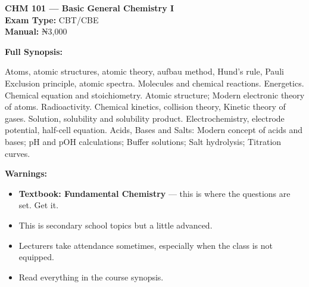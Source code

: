 \documentclass[11pt,a4paper]{article}
\begin{document}
\begin{coursebox}
    \textbf{\color{primary}\Large CHM 101 --- Basic General Chemistry I}\\[0.3em]
    \textbf{Exam Type:} CBT/CBE \\
    \textbf{Manual:} ₦3,000

    \vspace{0.8em}

    \textbf{Full Synopsis:}

    Atoms, atomic structures, atomic theory, aufbau method, Hund's rule, Pauli Exclusion principle, atomic spectra. Molecules and chemical reactions. Energetics. Chemical equation and stoichiometry. Atomic structure; Modern electronic theory of atoms. Radioactivity. Chemical kinetics, collision theory, Kinetic theory of gases. Solution, solubility and solubility product. Electrochemistry, electrode potential, half-cell equation.
    Acids, Bases and Salts: Modern concept of acids and bases; pH and pOH calculations; Buffer solutions; Salt hydrolysis; Titration curves.

    \vspace{0.8em}

    \textbf{\color{warningText}Warnings:}
    \begin{itemize}[leftmargin=1.5em, itemsep=0.2em]
        \item \textbf{Textbook: Fundamental Chemistry} --- this is where the questions are set. Get it.
        \item This is secondary school topics but a little advanced.
        \item Lecturers take attendance sometimes, especially when the class is not equipped.
        \item Read everything in the course synopsis.
    \end{itemize}
\end{coursebox}
\end{document}

